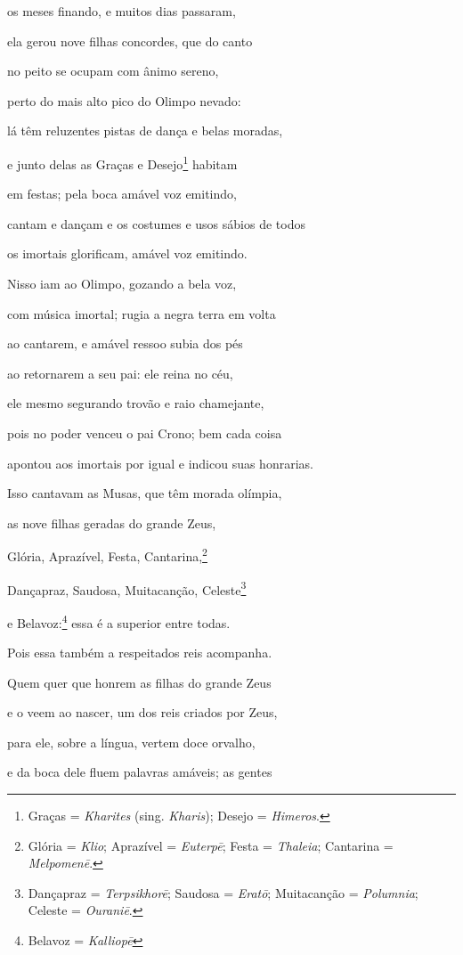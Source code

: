\begin{pages}
\begin{Rightside}
os meses finando, e muitos dias passaram,

ela gerou nove filhas concordes, que do canto 

no peito se ocupam com ânimo sereno,

perto do mais alto pico do Olimpo nevado:

lá têm reluzentes pistas de dança e belas moradas,

e junto delas as Graças e Desejo\footnote{Graças = \emph{Kharites} (sing. \emph{Kharis}); Desejo = \emph{Himeros}.} habitam

em festas; pela boca amável voz emitindo, 

cantam e dançam e os costumes e usos sábios de todos

os imortais glorificam, amável voz emitindo.

Nisso iam ao Olimpo, gozando a bela voz,

com música imortal; rugia a negra terra em volta

ao cantarem, e amável ressoo subia dos pés 

ao retornarem a seu pai: ele reina no céu,

ele mesmo segurando trovão e raio chamejante,

pois no poder venceu o pai Crono; bem cada coisa

apontou aos imortais por igual e indicou suas honrarias.

\quad{}Isso cantavam as Musas, que têm morada olímpia, 

as nove filhas geradas do grande Zeus,

Glória, Aprazível, Festa, Cantarina,\footnote{Glória = \emph{Klio}; Aprazível = \emph{Euterpē}; Festa = \emph{Thaleia}; Cantarina = \emph{Melpomenē}.}

Dançapraz, Saudosa, Muitacanção, Celeste\footnote{Dançapraz = \emph{Terpsikhorē}; Saudosa = \emph{Eratō}; Muitacanção = \emph{Polumnia}; Celeste = \emph{Ouraniē}.}

e Belavoz:\footnote{Belavoz = \emph{Kalliopē}} essa é a superior entre todas.

Pois essa também a respeitados reis acompanha. 

Quem quer que honrem as filhas do grande Zeus

e o veem ao nascer, um dos reis criados por Zeus,

para ele, sobre a língua, vertem doce orvalho,

e da boca dele fluem palavras amáveis; as gentes


\end{Rightside}
\end{pages}
